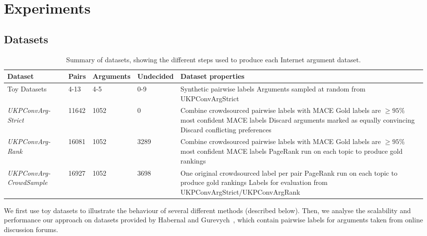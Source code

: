 \section{Experiments}\label{sec:expts}

\subsection{Datasets}
\begin{table}[h]
\small
  \begin{tabularx}{\textwidth}{ p{2.0cm} | p{0.6cm} p{1.2cm} p{1.2cm} X }
  Dataset & Pairs & Arguments & Undecided & Dataset properties \\\hline\hline
  Toy Datasets & 4-13 & 4-5 & 0-9 & Synthetic pairwise labels
  \newline Arguments sampled at random from UKPConvArgStrict\\  
  \hline\emph{UKPConvArg-Strict} &
  11642 &
  1052 & 
  0 &
  Combine crowdsourced pairwise labels with MACE \newline
  Gold labels are $\ge 95\%$ most confident MACE labels \newline
  Discard arguments marked as equally convincing \newline
  Discard conflicting preferences \\
  \hline\emph{UKPConvArg-Rank} &
  16081 &
  1052 &
  3289 &
  Combine crowdsourced pairwise labels with MACE \newline
  Gold labels are $\ge 95\%$ most confident MACE labels \newline
  PageRank run on each topic to produce gold rankings \\  
  \hline\emph{UKPConvArg-CrowdSample} &
  16927 & 
  1052 &
  3698 &
  One original crowdsourced label per pair\newline
  PageRank run on each topic to produce gold rankings \newline
  Labels for evaluation from UKPConvArgStrict/UKPConvArgRank
  \end{tabularx}
  \caption{\label{tab:expt_data} Summary of datasets, showing the different steps used to produce each Internet argument dataset.}
\end{table}
We first use toy datasets to illustrate the behaviour of several different methods (described below).
Then, 
we analyse the scalability and performance our approach on datasets provided by Habernal and Gurevych~,
which contain pairwise labels for arguments taken from online discussion forums.
